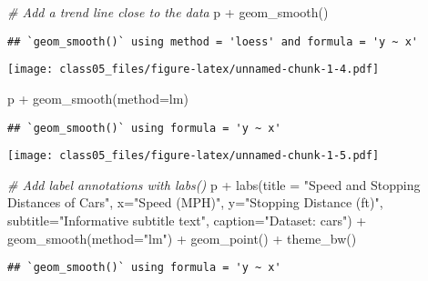 \documentclass[
]{article}
\newenvironment{Shaded}{\begin{snugshade}}{\end{snugshade}}
\newcommand{\AttributeTok}[1]{\textcolor[rgb]{0.77,0.63,0.00}{#1}}
\newcommand{\CommentTok}[1]{\textcolor[rgb]{0.56,0.35,0.01}{\textit{#1}}}
\newcommand{\FunctionTok}[1]{\textcolor[rgb]{0.00,0.00,0.00}{#1}}
\newcommand{\NormalTok}[1]{#1}
\newcommand{\SpecialCharTok}[1]{\textcolor[rgb]{0.00,0.00,0.00}{#1}}
\newcommand{\StringTok}[1]{\textcolor[rgb]{0.31,0.60,0.02}{#1}}
\begin{document}
\begin{Shaded}
\begin{Highlighting}[]
\CommentTok{\# Add a trend line close to the data}
\NormalTok{p }\SpecialCharTok{+} \FunctionTok{geom\_smooth}\NormalTok{()}
\end{Highlighting}
\end{Shaded}

\begin{verbatim}
## `geom_smooth()` using method = 'loess' and formula = 'y ~ x'
\end{verbatim}

\texttt{[image: class05\_files/figure-latex/unnamed-chunk-1-4.pdf]}

\begin{Shaded}
\begin{Highlighting}[]
\NormalTok{p }\SpecialCharTok{+} \FunctionTok{geom\_smooth}\NormalTok{(}\AttributeTok{method=}\NormalTok{lm)}
\end{Highlighting}
\end{Shaded}

\begin{verbatim}
## `geom_smooth()` using formula = 'y ~ x'
\end{verbatim}

\texttt{[image: class05\_files/figure-latex/unnamed-chunk-1-5.pdf]}

\begin{Shaded}
\begin{Highlighting}[]
\CommentTok{\# Add label annotations with labs()}
\NormalTok{p }\SpecialCharTok{+} \FunctionTok{labs}\NormalTok{(}\AttributeTok{title =} \StringTok{"Speed and Stopping Distances of Cars"}\NormalTok{,}
         \AttributeTok{x=}\StringTok{"Speed (MPH)"}\NormalTok{, }
         \AttributeTok{y=}\StringTok{"Stopping Distance (ft)"}\NormalTok{,}
         \AttributeTok{subtitle=}\StringTok{"Informative subtitle text"}\NormalTok{,}
         \AttributeTok{caption=}\StringTok{"Dataset: \textquotesingle{}cars\textquotesingle{}"}\NormalTok{) }\SpecialCharTok{+}
  \FunctionTok{geom\_smooth}\NormalTok{(}\AttributeTok{method=}\StringTok{"lm"}\NormalTok{) }\SpecialCharTok{+}
  \FunctionTok{geom\_point}\NormalTok{() }\SpecialCharTok{+}
  \FunctionTok{theme\_bw}\NormalTok{()}
\end{Highlighting}
\end{Shaded}

\begin{verbatim}
## `geom_smooth()` using formula = 'y ~ x'
\end{verbatim}
\end{document}
